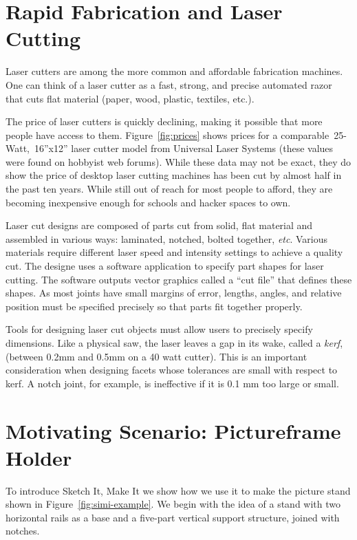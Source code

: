 \section{Rapid Fabrication and Laser Cutting}

Laser cutters are among the more common and affordable fabrication
machines. One can think of a laser cutter as a fast, strong, and
precise automated razor that cuts flat material (paper, wood, plastic,
textiles, etc.). 



The price of laser cutters is quickly declining, making it possible
that more people have access to them. Figure~\ref{fig:prices} shows
prices for a comparable~25-Watt,~16''x12'' laser cutter model from
Universal Laser Systems (these values were found on hobbyist web
forums). While these data may not be exact, they do show the price of
desktop laser cutting machines has been cut by almost half in the past
ten years. While still out of reach for most people to afford, they
are becoming inexpensive enough for schools and hacker spaces to own.

Laser cut designs are composed of parts cut from solid, flat material
and assembled in various ways: laminated, notched, bolted together,
\textit{etc}. Various materials require different laser speed and
intensity settings to achieve a quality cut. The designe uses a
software application to specify part shapes for laser cutting. The
software outputs vector graphics called a ``cut file'' that defines
these shapes. As most joints have small margins of error, lengths,
angles, and relative position must be specified precisely so that
parts fit together properly.

Tools for designing laser cut objects must allow users to precisely
specify dimensions. Like a physical saw, the laser leaves a gap in its
wake, called a \textit{kerf}, (between 0.2mm and 0.5mm on a 40 watt
cutter). This is an important consideration when designing facets
whose tolerances are small with respect to kerf. A notch joint, for
example, is ineffective if it is 0.1 mm too large or small.


\section{Motivating Scenario: Pictureframe Holder}



To introduce Sketch It, Make It we show how we use it to make the
picture stand shown in Figure~\ref{fig:simi-example}. We begin with
the idea of a stand with two horizontal rails as a base and a
five-part vertical support structure, joined with notches.

